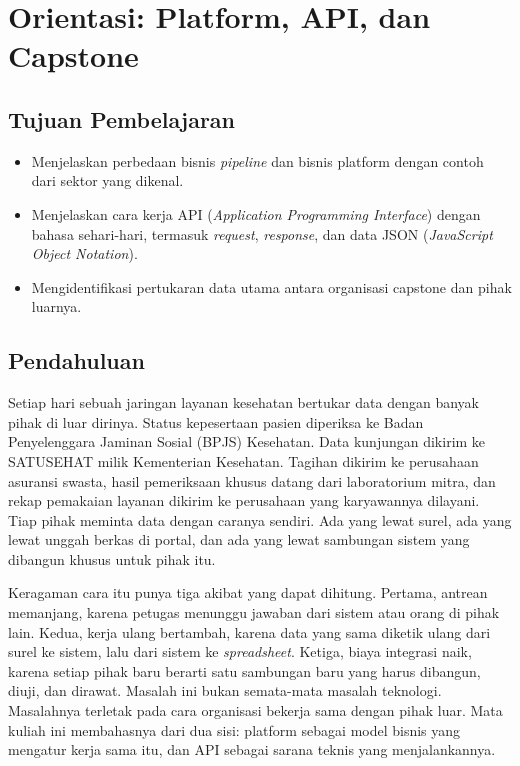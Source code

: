 \chapter{Orientasi: Platform, API, dan Capstone}


\section*{Tujuan Pembelajaran}
\begin{itemize}
  \item Menjelaskan perbedaan bisnis \textit{pipeline} dan bisnis platform dengan contoh dari sektor yang dikenal.
  \item Menjelaskan cara kerja API (\textit{Application Programming Interface}) dengan bahasa sehari-hari, termasuk \textit{request}, \textit{response}, dan data JSON (\textit{JavaScript Object Notation}).
  \item Mengidentifikasi pertukaran data utama antara organisasi capstone dan pihak luarnya.
\end{itemize}

\section{Pendahuluan}

Setiap hari sebuah jaringan layanan kesehatan bertukar data dengan banyak pihak
di luar dirinya. Status kepesertaan pasien diperiksa ke Badan Penyelenggara
Jaminan Sosial (BPJS) Kesehatan. Data kunjungan dikirim ke SATUSEHAT milik
Kementerian Kesehatan. Tagihan dikirim ke perusahaan asuransi swasta, hasil
pemeriksaan khusus datang dari laboratorium mitra, dan rekap pemakaian layanan
dikirim ke perusahaan yang karyawannya dilayani. Tiap pihak meminta data dengan
caranya sendiri. Ada yang lewat surel, ada yang lewat unggah berkas di portal,
dan ada yang lewat sambungan sistem yang dibangun khusus untuk pihak itu.

Keragaman cara itu punya tiga akibat yang dapat dihitung. Pertama, antrean
memanjang, karena petugas menunggu jawaban dari sistem atau orang di pihak lain.
Kedua, kerja ulang bertambah, karena data yang sama diketik ulang dari surel ke
sistem, lalu dari sistem ke \textit{spreadsheet}. Ketiga, biaya integrasi naik,
karena setiap pihak baru berarti satu sambungan baru yang harus dibangun, diuji,
dan dirawat. Masalah ini bukan semata-mata masalah teknologi. Masalahnya
terletak pada cara organisasi bekerja sama dengan pihak luar. Mata kuliah ini
membahasnya dari dua sisi: platform sebagai model bisnis yang mengatur kerja sama
itu, dan API sebagai sarana teknis yang menjalankannya.


